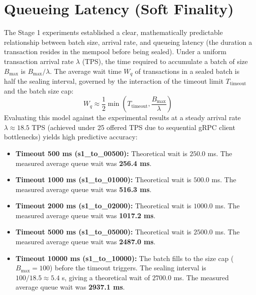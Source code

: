 \section{Queueing Latency (Soft Finality)}
\label{sec:latency_results}
The Stage 1 experiments established a clear, mathematically predictable relationship between batch size, arrival rate, and queueing latency (the duration a transaction resides in the mempool before being sealed).
Under a uniform transaction arrival rate $\lambda$ (TPS), the time required to accumulate a batch of size $B_{\text{max}}$ is $B_{\text{max}}/\lambda$. The average wait time $W_q$ of transactions in a sealed batch is half the sealing interval, governed by the interaction of the timeout limit $T_{\text{timeout}}$ and the batch size cap:
\begin{equation}
W_q \approx \frac{1}{2} \min\left(T_{\text{timeout}}, \frac{B_{\text{max}}}{\lambda}\right)
\end{equation}
Evaluating this model against the experimental results at a steady arrival rate $\lambda \approx 18.5$ TPS (achieved under 25 offered TPS due to sequential gRPC client bottlenecks) yields high predictive accuracy:
\begin{itemize}
    \item \textbf{Timeout 500 ms (s1\_to\_00500):} Theoretical wait is $250.0$ ms. The measured average queue wait was \textbf{256.4 ms}.
    \item \textbf{Timeout 1000 ms (s1\_to\_01000):} Theoretical wait is $500.0$ ms. The measured average queue wait was \textbf{516.3 ms}.
    \item \textbf{Timeout 2000 ms (s1\_to\_02000):} Theoretical wait is $1000.0$ ms. The measured average queue wait was \textbf{1017.2 ms}.
    \item \textbf{Timeout 5000 ms (s1\_to\_05000):} Theoretical wait is $2500.0$ ms. The measured average queue wait was \textbf{2487.0 ms}.
    \item \textbf{Timeout 10000 ms (s1\_to\_10000):} The batch fills to the size cap ($B_{\text{max}} = 100$) before the timeout triggers. The sealing interval is $100 / 18.5 \approx 5.4$ s, giving a theoretical wait of $2700.0$ ms. The measured average queue wait was \textbf{2937.1 ms}.
\end{itemize}
